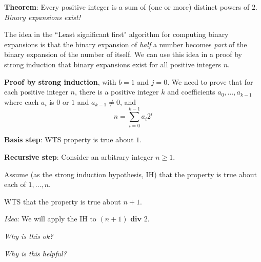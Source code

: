 
{\bf Theorem}: Every positive integer is a sum of (one or more) distinct powers of $2$.
{\it Binary expansions exist!}

%


The idea in the ``Least significant first" algorithm 
for computing binary expansions is that the binary
expansion of {\it half} a number becomes {\it part} of the binary expansion of 
the number of itself. We can use this 
idea in a proof by strong induction that binary expansions exist for all 
positive integers $n$.


{\bf Proof by strong induction}, with $b=1$ and $j=0$. We need to prove
that for each positive integer $n$, there is 
a positive integer $k$ and coefficients $a_0, \ldots, a_{k-1}$ 
where each $a_i$ is $0$ or $1$ and $a_{k-1} \neq 0$, and 
\[
n = \sum_{i=0}^{k-1} a_i 2^i
\]



{\bf Basis step}:  WTS property is true about  $1$.

\phantom{Choose $a_0 = 1$, then $(a_0)_2 = 1 \cdot 2^0 = 1$.}
\vspace{80pt}


{\bf Recursive step}: Consider an arbitrary integer $n \geq 1$.

Assume (as the strong induction hypothesis, IH) that the property is true about  each of $1, \ldots, n$.  

WTS that the property is true about $n+1$.

{\it Idea}: We will apply the IH to $(n+1) \textbf{ div } 2$.

{\it Why is this ok?}


\vfill
\newpage
{\it Why is this helpful?}

